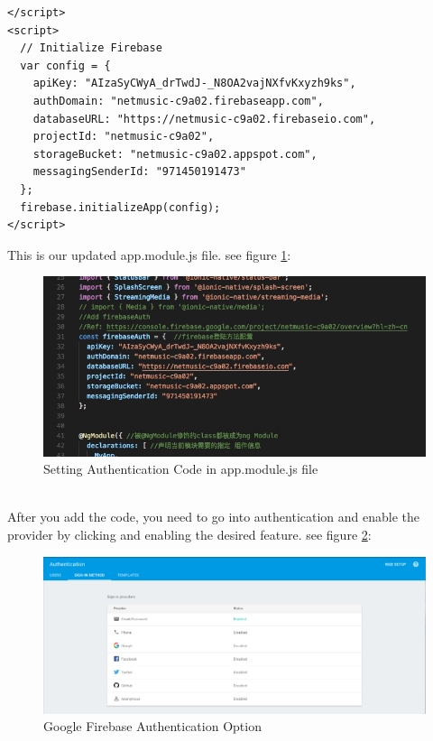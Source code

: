 \begin{itemize}
\begin{verbatim}
</script>
<script>
  // Initialize Firebase
  var config = {
    apiKey: "AIzaSyCWyA_drTwdJ-_N8OA2vajNXfvKxyzh9ks",
    authDomain: "netmusic-c9a02.firebaseapp.com",
    databaseURL: "https://netmusic-c9a02.firebaseio.com",
    projectId: "netmusic-c9a02",
    storageBucket: "netmusic-c9a02.appspot.com",
    messagingSenderId: "971450191473"
  };
  firebase.initializeApp(config);
</script>
\end{verbatim}
This is our updated app.module.js file.
see figure \ref{fig:5.9 cubed graph}:
\begin{figure}[h]
	\centering
	\includegraphics[scale=0.5]{img/firebaseauth5.png}
	\caption{Setting Authentication Code in app.module.js file}
	\label{fig:5.9 cubed graph}
\end{figure}
\\ After you add the code, you need to go into authentication and enable the provider by clicking and enabling the desired feature. see figure \ref{fig:5.10 cubed graph}:
\begin{figure}[h]
	\centering
	\includegraphics[scale=0.4]{img/firebaseauth4.png}
	\caption{Google Firebase Authentication Option}
	\label{fig:5.10 cubed graph}
\end{figure}
\end{itemize}
